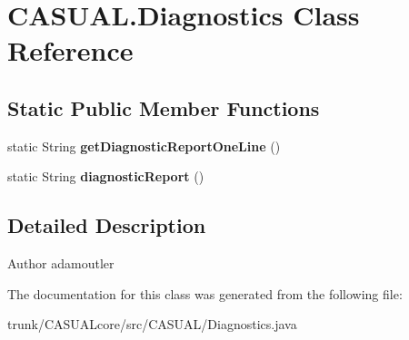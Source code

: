\hypertarget{class_c_a_s_u_a_l_1_1_diagnostics}{\section{C\-A\-S\-U\-A\-L.\-Diagnostics Class Reference}
\label{class_c_a_s_u_a_l_1_1_diagnostics}
}
\subsection*{Static Public Member Functions}
\begin{DoxyCompactItemize}
\item 
\hypertarget{class_c_a_s_u_a_l_1_1_diagnostics_a185c8bdbeba8bb6a1a4c4d59b45516ad}{static String {\bfseries get\-Diagnostic\-Report\-One\-Line} ()}\label{class_c_a_s_u_a_l_1_1_diagnostics_a185c8bdbeba8bb6a1a4c4d59b45516ad}

\item 
\hypertarget{class_c_a_s_u_a_l_1_1_diagnostics_a627fabe209ae2aabb66bfef52c854807}{static String {\bfseries diagnostic\-Report} ()}\label{class_c_a_s_u_a_l_1_1_diagnostics_a627fabe209ae2aabb66bfef52c854807}

\end{DoxyCompactItemize}


\subsection{Detailed Description}
\begin{DoxyAuthor}{Author}
adamoutler 
\end{DoxyAuthor}


The documentation for this class was generated from the following file\-:\begin{DoxyCompactItemize}
\item 
trunk/\-C\-A\-S\-U\-A\-Lcore/src/\-C\-A\-S\-U\-A\-L/Diagnostics.\-java\end{DoxyCompactItemize}

